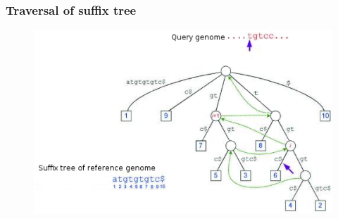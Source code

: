 \documentclass{beamer}
\begin{document}
\begin{frame}
  \frametitle{Traversal of suffix tree}
  \begin{figure}\includegraphics[scale=0.8]{st-mum.pdf}\end{figure}
\end{frame}
\end{document}
